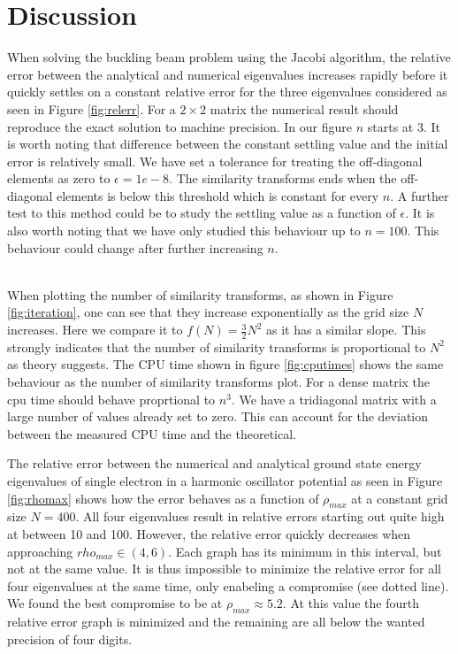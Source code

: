 \documentclass[twocolumn]{aastex62}
\begin{document}
\section{Discussion} \label{sec:discussion}
When solving the buckling beam problem using the Jacobi algorithm, the relative error between the analytical and numerical eigenvalues increases rapidly before it quickly settles on a constant relative error for the three eigenvalues considered as seen in Figure \ref{fig:relerr}. For a $2\times2$ matrix the numerical result should reproduce the exact solution to machine precision. In our figure $n$ starts at 3. It is worth noting that difference between the constant settling value and the initial error is relatively small. We have set a tolerance for treating the off-diagonal elements as zero to $\epsilon=1e-8$.  The similarity transforms ends when the off-diagonal elements is below this threshold which is constant for every $n$. A further test to this method could be to study the settling value as a function of $\epsilon$. It is also worth noting that we have only studied this behaviour up to $n=100$. This behaviour could change after further increasing $n$.  \\\\\indent

When plotting the number of similarity transforms, as shown in Figure \ref{fig:iteration}, one can see that they increase exponentially as the grid size $N$ increases. Here we compare it to $f(N) =\frac{3}{2}N^2$ as it has a similar slope. This strongly indicates that the number of similarity transforms is proportional to $N^2$ as theory suggests. The CPU time shown in figure \ref{fig:cputimes} shows the same behaviour as the number of similarity transforms plot. For a dense matrix the cpu time should behave proprtional to $n^3$. We have a tridiagonal matrix with a large number of values already set to zero. This can account for the deviation between the measured CPU time and the theoretical.  

The relative error between the numerical and analytical ground state energy eigenvalues of single electron in a harmonic oscillator potential as seen in Figure \ref{fig:rhomax} shows how the error behaves as a function of $\rho_{max}$ at a constant grid size $N = 400$. All four eigenvalues result in relative errors starting out quite high at between 10 and 100. However, the relative error quickly decreases when approaching $rho_{max}\in(4,6)$. Each graph has its minimum in this interval, but not at the same value. It is thus impossible to minimize the relative error for all four eigenvalues at the same time, only enabeling a compromise (see dotted line). We found the best compromise to be at $\rho_{max}\approx 5.2$. At this value the fourth relative error graph is minimized and the remaining are all below the wanted precision of four digits. 
\end{document}
